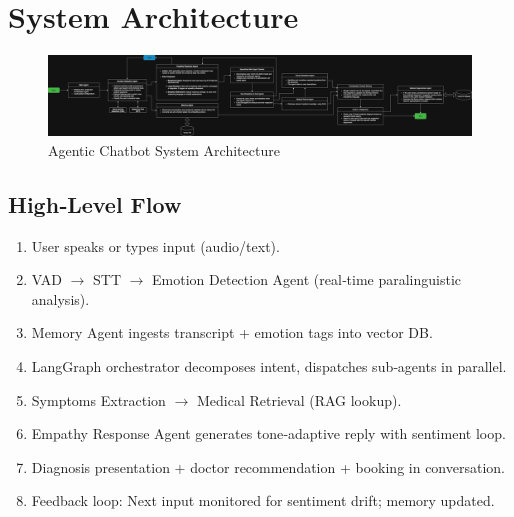 \documentclass[11pt,a4paper]{article}
\begin{document}
\section{System Architecture}
\begin{landscape}
  \begin{figure}[h!]
    \centering
    \includegraphics[height=0.32\textheight]{ChatBot_Healthcare_flow.png}
    \caption{Agentic Chatbot System Architecture}
    \label{fig:architecture}
  \end{figure}
\end{landscape}

\subsection{High‐Level Flow}
\begin{enumerate}[left=0pt]
  \item User speaks or types input (audio/text).
  \item VAD $\to$ STT $\to$ Emotion Detection Agent (real‐time paralinguistic analysis).
  \item Memory Agent ingests transcript + emotion tags into vector DB.
  \item LangGraph orchestrator decomposes intent, dispatches sub‐agents in parallel.
  \item Symptoms Extraction $\to$ Medical Retrieval (RAG lookup).
  \item Empathy Response Agent generates tone‐adaptive reply with sentiment loop.
  \item Diagnosis presentation + doctor recommendation + booking in conversation.
  \item Feedback loop: Next input monitored for sentiment drift; memory updated.
\end{enumerate}
\end{document}
